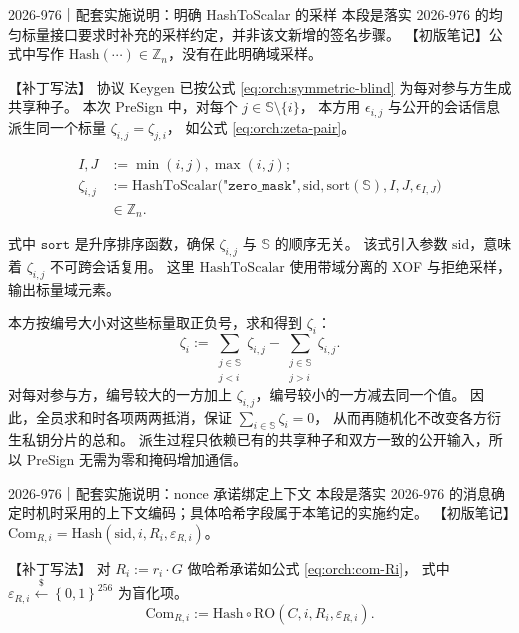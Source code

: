 \begin{patchnote}{2026-976｜配套实施说明：明确 HashToScalar 的采样}
本段是落实 2026-976 的均匀标量接口要求时补充的采样约定，并非该文新增的签名步骤。
【初版笔记】公式中写作 $\mathrm{Hash}(\cdots)\in\mathbb Z_n$，没有在此明确域采样。

【补丁写法】
协议 Keygen 已按公式 \eqref{eq:orch:symmetric-blind} 为每对参与方生成共享种子。
本次 PreSign 中，对每个 $j\in\mathbb{S}\setminus\{i\}$，
本方用 $\epsilon_{i,j}$ 与公开的会话信息派生同一个标量 $\zeta_{i,j}=\zeta_{j,i}$，
如公式 \eqref{eq:orch:zeta-pair}。

\begin{equation}
  \label{eq:orch:zeta-pair}\tag{zeta-pair}
  \begin{aligned}
    I, J &:= \min(i,j),\max(i,j); \\
    \zeta_{i,j}&:=\mathrm{HashToScalar}\bigl(
      \texttt{"zero\_mask"},\mathrm{sid},\mathrm{sort}(\mathbb{S}),
        I, J,\epsilon_{I, J}\bigr) \\
    &\in\mathbb{Z}_n.
  \end{aligned}
\end{equation}

式中 $\mathtt{sort}$ 是升序排序函数，确保 $\zeta_{i,j}$ 与 $\mathbb{S}$ 的顺序无关。
该式引入参数 $\mathrm{sid}$，意味着 $\zeta_{i,j}$ 不可跨会话复用。
这里 $\mathrm{HashToScalar}$ 使用带域分离的 XOF 与拒绝采样，输出标量域元素。
\end{patchnote}

本方按编号大小对这些标量取正负号，求和得到 $\zeta_i$：
\begin{equation}
  \label{eq:orch:zeta}\tag{zeta}
  \zeta_i := \sum_{\substack{j\in\mathbb{S}\\j<i}} \zeta_{i,j}
  - \sum_{\substack{j\in\mathbb{S}\\j>i}} \zeta_{i,j}.
\end{equation}
对每对参与方，编号较大的一方加上 $\zeta_{i,j}$，编号较小的一方减去同一个值。
因此，全员求和时各项两两抵消，保证 $\sum_{i\in\mathbb{S}}\zeta_i=0$，
从而再随机化不改变各方衍生私钥分片的总和。
派生过程只依赖已有的共享种子和双方一致的公开输入，所以 PreSign 无需为零和掩码增加通信。

\begin{patchnote}{2026-976｜配套实施说明：nonce 承诺绑定上下文}
本段是落实 2026-976 的消息确定时机时采用的上下文编码；具体哈希字段属于本笔记的实施约定。
【初版笔记】$\mathrm{Com}_{R,i}=\mathrm{Hash}(\mathrm{sid},i,R_i,\varepsilon_{R,i})$。

【补丁写法】
对 $R_i := r_i \cdot G$ 做哈希承诺如公式 \eqref{eq:orch:com-Ri}，
式中 $\varepsilon_{R,i} \stackrel{\$}{\leftarrow} \left\{0,1\right\}^{256}$ 为盲化项。
\begin{equation}
  \label{eq:orch:com-Ri}\tag{Com-Ri}
  \mathrm{Com}_{R,i} := \mathrm{Hash} \circ \mathrm{RO}(C,i,R_i,\varepsilon_{R,i}).
\end{equation}
\end{patchnote}

